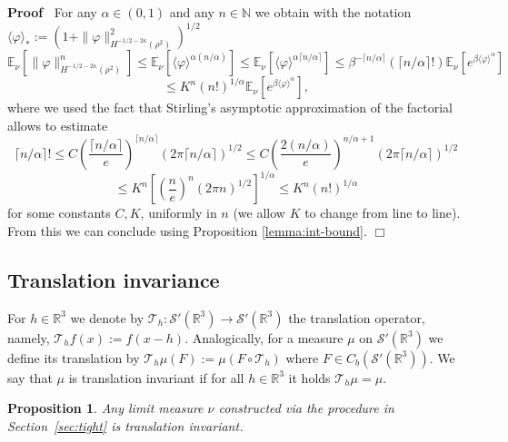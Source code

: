 \documentclass[a4paper,11pt]{article}
\newcommand{\assign}{:=}
\newenvironment{proof}{\noindent\textbf{Proof\ }}{\hspace*{\fill}$\Box$\medskip}
\newtheorem{proposition}[theorem]{Proposition}
\numberwithin{equation}{section}
\begin{document}
\begin{proof}
  For any $\alpha \in (0, 1)$ and any $n \in\mathbb{N}$ we obtain with  the notation $\langle
\varphi \rangle_{\ast} \assign (1 + \| 
\varphi \|_{H^{- 1 / 2 - 2 \kappa}(\rho^{2})}^2)^{1 / 2}$
  \[ \mathbb{E}_{\nu} [\| \varphi \|_{H^{- 1 / 2 -2 \kappa} (\rho^2)}^n] \leqslant
     \mathbb{E}_{\nu} [\langle \varphi \rangle^{\alpha (n / \alpha)}] \leqslant
     \mathbb{E}_{\nu} [\langle \varphi \rangle^{\alpha \lceil n / \alpha \rceil}]
     \leqslant \beta^{- \lceil n / \alpha \rceil} (\lceil n / \alpha \rceil !)
     \mathbb{E}_{\nu} [e^{\beta \langle \varphi \rangle^{\alpha}}] \]
  \[ \leqslant K^n (n!)^{1 / \alpha} \mathbb{E}_{\nu} [e^{\beta \langle \varphi
     \rangle^{\alpha}}] ,\]
  where we used the fact that Stirling's asymptotic approximation of the
  factorial allows to estimate
  \[ \lceil n / \alpha \rceil ! \leqslant C \left( \frac{\lceil n / \alpha
     \rceil}{e} \right)^{\lceil n / \alpha \rceil} (2 \pi \lceil n / \alpha
     \rceil)^{1 / 2} \leqslant C \left( \frac{2 (n / \alpha)}{e} \right)^{n /
     \alpha + 1} (2 \pi \lceil n / \alpha \rceil)^{1 / 2} \]
  \[ \leqslant K^n \left[ \left( \frac{n}{e} \right)^n (2 \pi n)^{1 / 2}
     \right]^{1 / \alpha} \leqslant K^n (n!)^{1 / \alpha} \]
  for some constants $C, K$, uniformly in $n$ (we allow $K$ to change from
  line to line). From this we can conclude using Proposition \ref{lemma:int-bound}.
\end{proof}







\subsection{Translation invariance}
\label{ss:OS1}

For $h \in \mathbb{R}^3$ we denote by $\mathcal{T}_h : \mathcal{S}'
(\mathbb{R}^3) \rightarrow \mathcal{S}' (\mathbb{R}^3)$ the translation
operator, namely, $\mathcal{T}_h f (x) \assign f (x - h)$. Analogically, for a
measure $\mu$ on $\mathcal{S}' (\mathbb{R}^3)$ we define its translation by
$\mathcal{T}_h \mu (F) \assign \mu (F \circ \mathcal{T}_h)$ where $F \in C_b
(\mathcal{S}' (\mathbb{R}^3))$. We say that $\mu$ is translation invariant if
for all $h \in \mathbb{R}^3$ it holds $\mathcal{T}_h \mu = \mu$.

\begin{proposition}
 Any limit measure $\nu$ constructed via the procedure in Section~\ref{sec:tight} is translation
  invariant.
\end{proposition}
\end{document}
